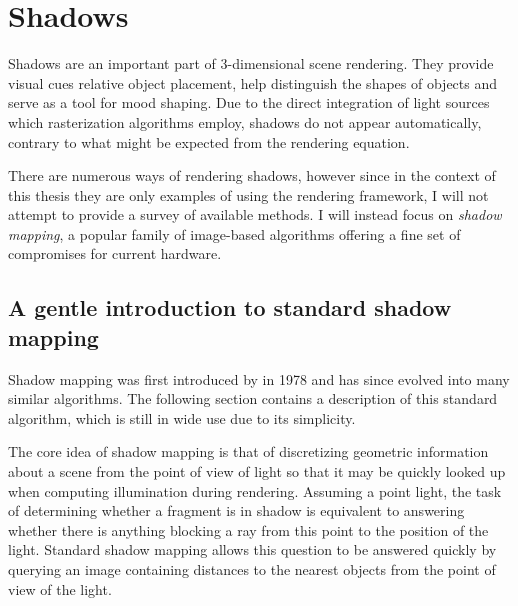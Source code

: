 \clearpage
\section{Shadows}

Shadows are an important part of 3-dimensional scene rendering. They provide visual cues relative object placement, help distinguish the shapes of objects and serve as a tool for mood shaping. Due to the direct integration of light sources which rasterization algorithms employ, shadows do not appear automatically, contrary to what might be expected from the rendering equation.

There are numerous ways of rendering shadows, however since in the context of this thesis they are only examples of using the rendering framework, I will not attempt to provide a survey of available methods. I will instead focus on \emph{shadow mapping}, a popular family of image-based algorithms offering a fine set of compromises for current hardware.

\subsection{A gentle introduction to standard shadow mapping}

Shadow mapping was first introduced by \citet{Williams78castingcurved} in 1978 and has since evolved into many similar algorithms. The following section contains a description of this standard algorithm, which is still in wide use due to its simplicity.

The core idea of shadow mapping is that of discretizing geometric information about a scene from the point of view of  light so that it may be quickly looked up when computing illumination during rendering. Assuming a point light, the task of determining whether a fragment is in shadow is equivalent to answering whether there is anything blocking a ray from this point to the position of the light. Standard shadow mapping allows this question to be answered quickly by querying an image containing distances to the nearest objects from the point of view of the light.

